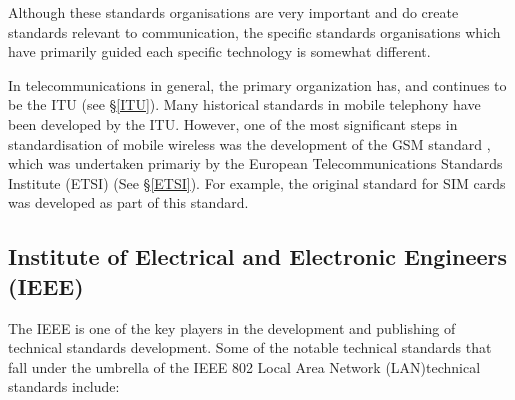 Although these standards organisations are very important and 
do create standards relevant to communication, the specific standards
organisations which have primarily guided each specific technology is
somewhat different.

In telecommunications in general, the primary organization has, and continues
to be the ITU (see \S\ref{ITU}). Many historical standards in mobile
telephony have been developed by the ITU. However, one of the most significant
steps in standardisation of mobile wireless was the
development of the GSM standard \cite{GSM}, which was undertaken primariy by the
European Telecommunications Standards Institute (ETSI) (See \S\ref{ETSI}).
For example, the original standard for SIM cards was developed as part of
this standard.



\subsection{Institute of Electrical and Electronic Engineers (IEEE)}

The IEEE is one of the key players in the development and publishing
of technical  standards development. Some of the notable technical
standards that fall under the umbrella of the IEEE 802 Local Area Network
(LAN)technical standards include:

